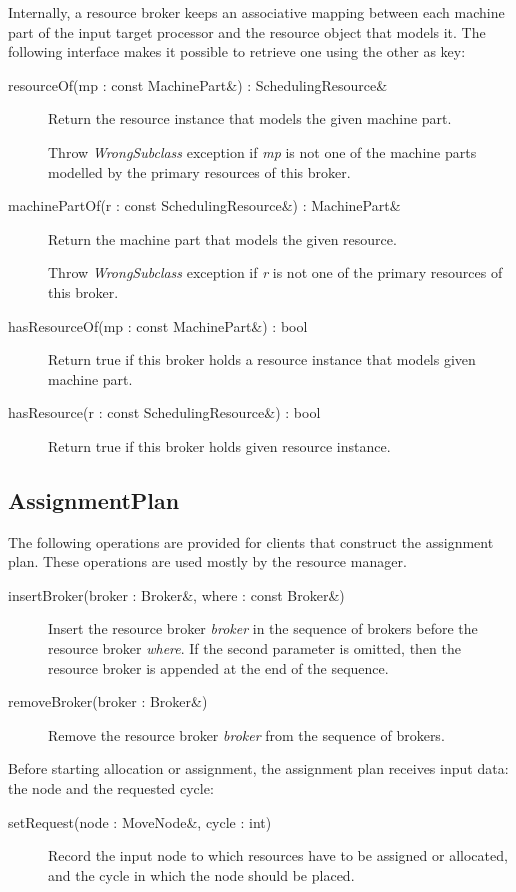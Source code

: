 \documentclass[a4paper,twoside]{tce}
\begin{document}
Internally, a resource broker keeps an associative mapping between each
machine part of the input target processor and the resource object that
models it. The following interface makes it possible to retrieve one using
the other as key:
\begin{description}
\item[resourceOf(mp : const MachinePart\&) : SchedulingResource\&]%
  Return the resource instance that models the given machine part.

  Throw \emph{WrongSubclass} exception if \emph{mp} is not one of the
  machine parts modelled by the primary resources of this broker.
\item[machinePartOf(r : const SchedulingResource\&) : MachinePart\&]%
  Return the machine part that models the given resource.

  Throw \emph{WrongSubclass} exception if \emph{r} is not one of the primary
  resources of this broker.
\item[hasResourceOf(mp : const MachinePart\&) : bool]%
  Return true if this broker holds a resource instance that models given
  machine part.
\item[hasResource(r : const SchedulingResource\&) : bool]%
  Return true if this broker holds given resource instance.
\end{description}

\subsection{AssignmentPlan}
\label{ssec:AssignmentPlan-if}

The following operations are provided for clients that construct the
assignment plan. These operations are used mostly by the resource manager.
\begin{description}
\item[insertBroker(broker : Broker\&, where : const Broker\&)]%
  Insert the resource broker \emph{broker} in the sequence of brokers before
  the resource broker \emph{where}. If the second parameter is omitted, then
  the resource broker is appended at the end of the sequence.
\item[removeBroker(broker : Broker\&)]%
  Remove the resource broker \emph{broker} from the sequence of brokers.
\end{description}

Before starting allocation or assignment, the assignment plan receives input
data: the node and the requested cycle:
\begin{description}
\item[setRequest(node : MoveNode\&, cycle : int)]%
  Record the input node to which resources have to be assigned or allocated,
  and the cycle in which the node should be placed.
\end{description}
\end{document}
